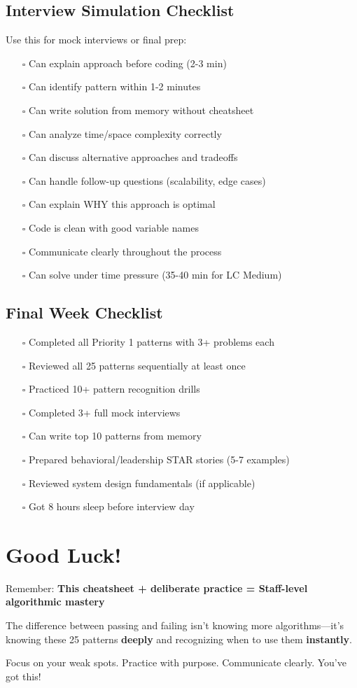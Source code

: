 \documentclass[10pt]{article}
\begin{document}
\subsection{Interview Simulation Checklist}

Use this for mock interviews or final prep:

\begin{enumerate}
\item[$\square$] Can explain approach before coding (2-3 min)
\item[$\square$] Can identify pattern within 1-2 minutes
\item[$\square$] Can write solution from memory without cheatsheet
\item[$\square$] Can analyze time/space complexity correctly
\item[$\square$] Can discuss alternative approaches and tradeoffs
\item[$\square$] Can handle follow-up questions (scalability, edge cases)
\item[$\square$] Can explain WHY this approach is optimal
\item[$\square$] Code is clean with good variable names
\item[$\square$] Communicate clearly throughout the process
\item[$\square$] Can solve under time pressure (35-40 min for LC Medium)
\end{enumerate}

\subsection{Final Week Checklist}

\begin{enumerate}
\item[$\square$] Completed all Priority 1 patterns with 3+ problems each
\item[$\square$] Reviewed all 25 patterns sequentially at least once
\item[$\square$] Practiced 10+ pattern recognition drills
\item[$\square$] Completed 3+ full mock interviews
\item[$\square$] Can write top 10 patterns from memory
\item[$\square$] Prepared behavioral/leadership STAR stories (5-7 examples)
\item[$\square$] Reviewed system design fundamentals (if applicable)
\item[$\square$] Got 8 hours sleep before interview day
\end{enumerate}

\section*{Good Luck!}

Remember: \textbf{This cheatsheet + deliberate practice = Staff-level algorithmic mastery}

The difference between passing and failing isn't knowing more algorithms—it's knowing these 25 patterns \textbf{deeply} and recognizing when to use them \textbf{instantly}.

Focus on your weak spots. Practice with purpose. Communicate clearly. You've got this!
\end{document}
